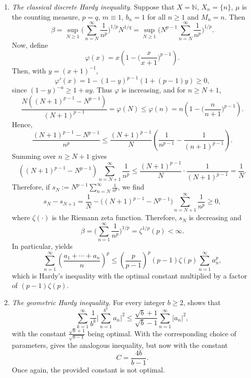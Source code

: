 \documentclass[oneside,10pt]{article}          %
\numberwithin{equation}{section}
\begin{document}
\begin{enumerate}
    \item \emph{The classical discrete Hardy inequality}. Suppose that $X=\mathbb{N}$, $X_n=\{n\}$, $\mu$ is the counting measure, $p=q$, $m\equiv 1$, $b_n=1$ for all $n\geq 1$ and $M_n=n$. Then
    \[
    \beta = \sup_{N\geq 1} \bigg( \sum_{n=N}^{\infty}\frac{1}{n^p} \bigg)^{\!\!1/p}\! N^{1/q} = \sup_{N\geq 1} \bigg( N^{p-1}\sum_{n=N}^{\infty}\frac{1}{n^p} \bigg)^{\!\!1/p}\!.
    \]
    Now, define
    \[
    \varphi(x)=x\left(1-\Big(\frac{x}{x+1}\Big)^{p-1}\right).
    \]
    Then, with $y=(x+1)^{-1}$,
    \[
        \varphi'(x)=1-(1-y)^{p-1}(1+(p-1)y)\geq 0,
    \]
    since $(1-y)^{-a}\geq 1+ay$. Thus $\varphi$ is increasing, and for
    $n\geq N+1$,
    \[
    \frac{N((N+1)^{p-1}-N^{p-1})}{(N+1)^{p-1}} =\varphi(N)\leq \varphi(n) =n\!\left(1-\Big(\frac{n}{n+1}\Big)^{p-1}\right).
    \]
    Hence,
    \[
    \frac{(N+1)^{p-1}-N^{p-1}}{n^{p}} \leq \frac{(N+1)^{p-1}}{N} \left(\frac{1}{n^{p-1}}-\frac{1}{(n+1)^{p-1}}\right).
    \]
    Summing over $n\geq N+1$ gives
    \[
    ((N+1)^{p-1}-N^{p-1})\sum_{n=N+1}^{\infty}\frac{1}{n^{p}} \leq \frac{(N+1)^{p-1}}{N}\cdot\frac{1}{(N+1)^{p-1}} = \frac{1}{N}.
    \]
    Therefore, if $s_N:=N^{p-1}\sum_{n=N}^{\infty}\frac{1}{n^p}$, we find
    \[
    s_N-s_{N+1} = \frac{1}{N} - \bigl((N+1)^{p-1}-N^{p-1}\bigr) \sum_{n=N+1}^{\infty}\frac{1}{n^p} \geq 0,
    \]
    where $\zeta(\cdot)$ is the Riemann zeta function. Therefore, $s_N$ is decreasing and
    \[
    \beta =  \bigg(\sum_{n=1}^{\infty}\frac{1}{n^p} \bigg)^{\!\!1/p} \!= \zeta^{1/p}(p) < \infty.
    \]
    In particular,  yields 
    \[
    \sum_{n=1}^{\infty} \left( \frac{a_1+\cdots+a_n}{n} \right)^p \leq \left(\frac{p}{p-1}\right)^{\!p} (p-1)\zeta(p) \sum_{n=1}^{\infty} a_n^p,
    \]
    which is Hardy's inequality with the optimal constant multiplied by a factor of $(p-1)\zeta(p)$.

    \item \emph{The geometric Hardy inequality.} For every integer $b\geq 2$, \cite{Bouthat2023} shows that
    \[
    \sum_{k=1}^\infty \frac{1}{b^k} \bigg| \sum_{n=1}^{b^k} a_n \bigg|^2  \!\leq \frac{\sqrt{b}+1}{\sqrt{b}-1} \sum_{n=1}^\infty |a_n|^2 ,
    \]
    with the constant $\frac{\sqrt{b}+1}{\sqrt{b-1}} $ being optimal. With the corresponding choice of parameters,  gives the analogous inequality, but now with the constant 
    \[
    C = \frac{4b}{b-1}.
    \]
    Once again, the provided constant is not optimal.
\end{enumerate}
\end{document}
